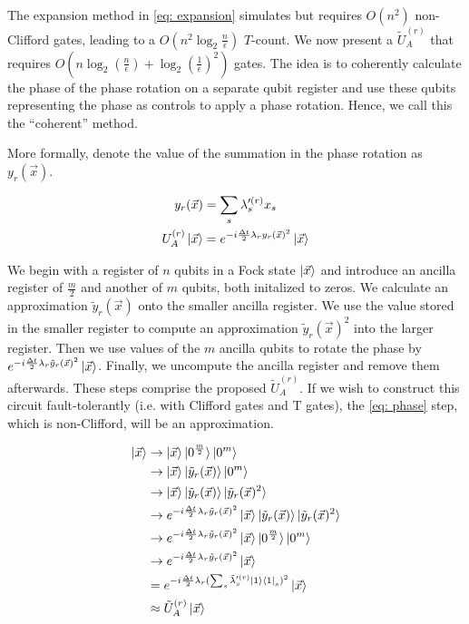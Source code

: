 The expansion method in \eqref{eq: expansion} simulates but requires $O(n^2)$ non-Clifford gates, leading to a $O(n^2\log_2{\frac{n}{\epsilon}})$ $T$-count. We now present a $\tilde{U}_A^{(r)}$ that requires $O(n\log_2(\frac{n}{\epsilon}) + \log_2(\frac{1}{\epsilon})^2)$ gates. The idea is to coherently calculate the phase of the phase rotation on a separate qubit register and use these qubits representing the phase as controls to apply a phase rotation. Hence, we call this the ``coherent'' method.

More formally, denote the value of the summation in the phase rotation as $y_r(\vec{x})$.

\begin{equation}
    \begin{split}
        y_r(\vec{x}) &= \sum_s \lambda'^{(r)}_s x_s \\
        U_A^{(r)}\ket{\vec{x}} &= e^{-i\frac{\Delta t}{2}\lambda_ry_r(\vec{x})^2}\ket{\vec{x}}
    \end{split}
\end{equation}

We begin with a register of $n$ qubits in a Fock state $\ket{\vec{x}}$ and introduce an ancilla register of $\frac{m}{2}$ and another of $m$ qubits, both initalized to zeros. We calculate an approximation $\tilde{y}_r(\vec{x})$ onto the smaller ancilla register. We use the value stored in the smaller register to compute an approximation $\tilde{y}_r(\vec{x})^2$ into the larger register. Then we use values of the $m$ ancilla qubits to rotate the phase by $e^{-i\frac{\Delta t}{2}\lambda_r\tilde{y}_r(\vec{x})^2}\ket{\vec{x}}$. Finally, we uncompute the ancilla register and remove them afterwards. These steps comprise the proposed $\tilde{U}_A^{(r)}$. If we wish to construct this circuit fault-tolerantly (i.e. with Clifford gates and T gates), the \eqref{eq: phase} step, which is non-Clifford, will be an approximation. 

\begin{align}
    \ket{\vec{x}} &\rightarrow \ket{\vec{x}}\ket{0^{\frac{m}{2}}}\ket{0^m} \\
    &\rightarrow \ket{\vec{x}}\ket{\tilde{y}_r(\vec{x})}\ket{0^m} \label{eq: summation}\\
    &\rightarrow \ket{\vec{x}}\ket{\tilde{y}_r(\vec{x})}\ket{\tilde{y}_r(\vec{x})^2} \label{eq: squaring} \\
    &\rightarrow e^{-i\frac{\Delta t}{2}\lambda_r\tilde{y}_r(\vec{x})^2}\ket{\vec{x}}\ket{\tilde{y}_r(\vec{x})}\ket{\tilde{y}_r(\vec{x})^2} \label{eq: phase} \\
    &\rightarrow e^{-i\frac{\Delta t}{2}\lambda_r\tilde{y}_r(\vec{x})^2}\ket{\vec{x}}\ket{0^{\frac{m}{2}}}\ket{0^m} \\
    &\rightarrow e^{-i\frac{\Delta t}{2}\lambda_r\tilde{y}_r(\vec{x})^2}\ket{\vec{x}} \\
    &= e^{-i\frac{\Delta t}{2}\lambda_r(\sum_s \tilde{\lambda}'^{(r)}_s \ket{1}\bra{1}_s)^2}\ket{\vec{x}} \\
    &\approx \tilde{U}_A^{(r)}\ket{\vec{x}}
\end{align}

